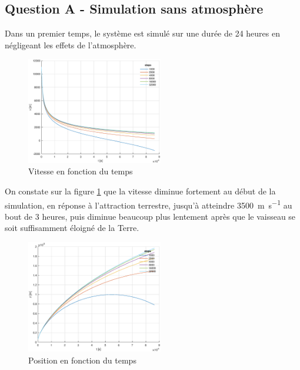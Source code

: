 \documentclass[a4paper,12pt,twoside]{article}
\begin{document}
\subsection{Question A - Simulation sans atmosphère}
Dans un premier temps, le système est simulé sur une durée de 24 heures en négligeant les effets de l'atmosphère.


\begin{figure}[h]
	\centering
    \includegraphics[width=0.53\textwidth]{graphs/vA.eps}
    \caption{Vitesse en fonction du temps}
    \label{fig:A-vt}
\end{figure}

On constate sur la figure \ref{fig:A-vt} que la vitesse diminue fortement au début de la simulation, en réponse à l'attraction terrestre, jusqu'à atteindre \SI{3500}{\meter\per\second} au bout de 3 heures, puis diminue beaucoup plus lentement après que le vaisseau se soit suffisamment éloigné de la Terre.\\


\begin{figure}[h]
	\centering
	\includegraphics[width=0.53\textwidth]{graphs/zA.eps}
	\caption{Position en fonction du temps}
	\label{fig:A-zt}
\end{figure}
\end{document}
